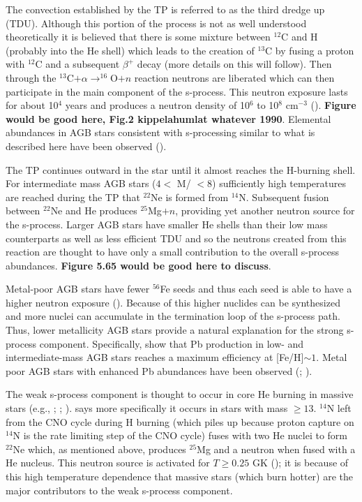 The convection established by the TP is referred to as the third
dredge up (TDU).  Although this portion of the process is not as well
understood theoretically it is believed that there is some mixture
between $^{12}$C
and H (probably into the He shell) which leads to the creation of
$^{13}$C by fusing a proton 
with $^{12}$C and a subsequent $\beta^+$ decay (more details on this
will follow).  Then through the
$^{13}$C$+ \alpha \rightarrow ^{16}$O$+n$ reaction neutrons are
liberated which can then participate in the main component of the
s-process.  This neutron exposure lasts for about 10$^4$ years and
produces a neutron density of 10$^6$ to 10$^8$ cm$^{-3}$
(\citealt{kappeleretal2011}).  {\bf Figure would be good here, Fig.2
kippelahumlat whatever 1990}.  Elemental abundances in AGB stars consistent with
s-processing similar to what is described here have been observed (\citealt{smithlambert1990}).

The TP continues outward in the star until it almost reaches the
H-burning shell.  For intermediate mass  AGB stars ($4<$ M/\Msol
$< 8$) sufficiently high temperatures are reached during the TP that 
 $^{22}$Ne is formed from $^{14}$N.  Subsequent fusion
between $^{22}$Ne and He produces $^{25}$Mg$+n$, providing yet another
neutron source for the s-process.  Larger AGB stars have smaller He
shells than their low mass counterparts as well as less efficient TDU
and so the neutrons created from this reaction are thought to have
only a small contribution to the overall s-process abundances.  {\bf
Figure 5.65 would be good here to discuss}.

Metal-poor AGB stars have fewer $^{56}$Fe seeds and thus each seed is
able to have a higher neutron exposure (\citealt{gallinoetal1998}).
Because of this higher nuclides can be synthesized and more nuclei can
accumulate in the termination loop of the s-process path.  Thus, lower
metallicity AGB stars provide a natural explanation for the strong
s-process component.  Specifically, \cite{travaglioetal2001} show that 
Pb production
in low- and intermediate-mass AGB stars reaches a maximum efficiency
at [Fe/H]$\sim 1$.  Metal poor AGB stars with enhanced Pb abundances
have been observed (\citealt{vaneck2001}; \citealt{vanecketal2003}).

The weak s-process component is thought to occur in core He burning in
massive stars
(e.g., \citealt{peters1968}; \citealt{couch1974}; \citealt{raiteri1991}).
\cite{iliadis2008} says more specifically it occurs in stars with mass
$\geq13$\Msol.  $^{14}$N left from the CNO cycle during H burning
(which piles up because proton capture on $^{14}$N is the rate
limiting step of the CNO cycle) fuses with two He nuclei to form
$^{22}$Ne which, as mentioned above, produces $^{25}$Mg and a neutron
when fused with a He nucleus.  This neutron source is activated for
$T \geq 0.25$ GK (\citealt{iliadis2008}); it is because of this high
temperature dependence that massive stars (which burn hotter) are the
major contributors to the weak s-process component.  

